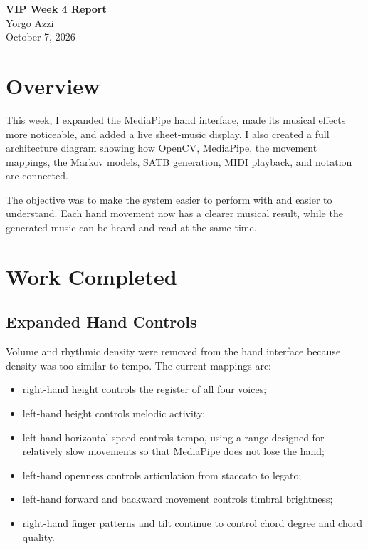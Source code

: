 \documentclass[11pt,a4paper]{article}
\begin{document}
\begin{center}
    {\Large\bfseries VIP Week 4 Report}\\[0.5em]
    {\large Yorgo Azzi}\\[0.25em]
    October 7, 2026
\end{center}

\section{Overview}

This week, I expanded the MediaPipe hand interface, made its musical effects
more noticeable, and added a live sheet-music display. I also created a full
architecture diagram showing how OpenCV, MediaPipe, the movement mappings, the
Markov models, SATB generation, MIDI playback, and notation are connected.

The objective was to make the system easier to perform with and easier to
understand. Each hand movement now has a clearer musical result, while the
generated music can be heard and read at the same time.

\section{Work Completed}

\subsection{Expanded Hand Controls}

Volume and rhythmic density were removed from the hand interface because
density was too similar to tempo. The current mappings are:

\begin{itemize}
    \item right-hand height controls the register of all four voices;
    \item left-hand height controls melodic activity;
    \item left-hand horizontal speed controls tempo, using a range designed
    for relatively slow movements so that MediaPipe does not lose the hand;
    \item left-hand openness controls articulation from staccato to legato;
    \item left-hand forward and backward movement controls timbral brightness;
    \item right-hand finger patterns and tilt continue to control chord degree
    and chord quality.
\end{itemize}
\end{document}
